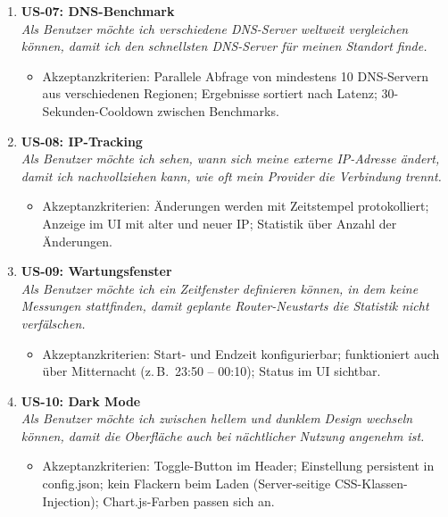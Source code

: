 \begin{enumerate}[resume]
  \item \textbf{US-07: DNS-Benchmark}\\
    \textit{Als Benutzer möchte ich verschiedene DNS-Server weltweit vergleichen können, damit
    ich den schnellsten DNS-Server für meinen Standort finde.}
    \begin{itemize}
      \item Akzeptanzkriterien: Parallele Abfrage von mindestens 10 DNS-Servern aus
        verschiedenen Regionen; Ergebnisse sortiert nach Latenz; 30-Sekunden-Cooldown
        zwischen Benchmarks.
    \end{itemize}

  \item \textbf{US-08: IP-Tracking}\\
    \textit{Als Benutzer möchte ich sehen, wann sich meine externe IP-Adresse ändert, damit
    ich nachvollziehen kann, wie oft mein Provider die Verbindung trennt.}
    \begin{itemize}
      \item Akzeptanzkriterien: Änderungen werden mit Zeitstempel protokolliert;
        Anzeige im UI mit alter und neuer IP; Statistik über Anzahl der Änderungen.
    \end{itemize}

  \item \textbf{US-09: Wartungsfenster}\\
    \textit{Als Benutzer möchte ich ein Zeitfenster definieren können, in dem keine Messungen
    stattfinden, damit geplante Router-Neustarts die Statistik nicht verfälschen.}
    \begin{itemize}
      \item Akzeptanzkriterien: Start- und Endzeit konfigurierbar; funktioniert auch über
        Mitternacht (z.\,B.\ 23:50 -- 00:10); Status im UI sichtbar.
    \end{itemize}

  \item \textbf{US-10: Dark Mode}\\
    \textit{Als Benutzer möchte ich zwischen hellem und dunklem Design wechseln können, damit
    die Oberfläche auch bei nächtlicher Nutzung angenehm ist.}
    \begin{itemize}
      \item Akzeptanzkriterien: Toggle-Button im Header; Einstellung persistent in
        config.json; kein Flackern beim Laden (Server-seitige CSS-Klassen-Injection);
        Chart.js-Farben passen sich an.
    \end{itemize}


\end{enumerate}
